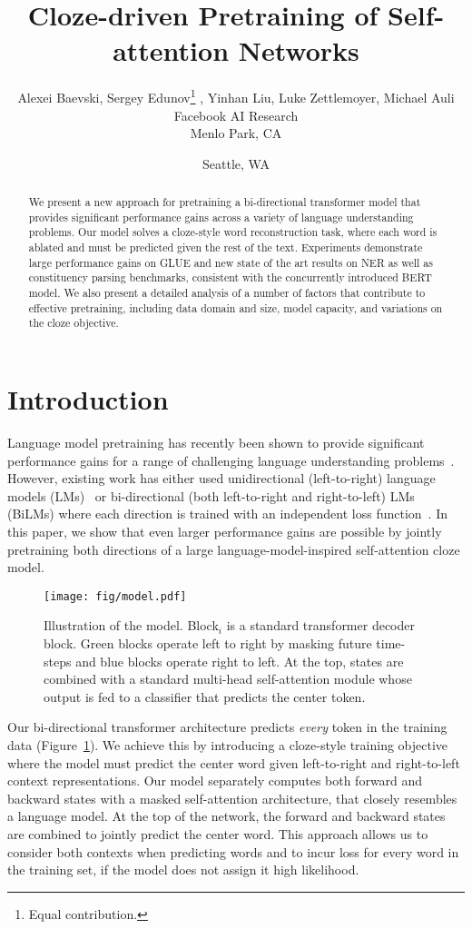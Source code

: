 \documentclass[11pt,a4paper]{article}
\title{Cloze-driven Pretraining of Self-attention Networks}
\author{Alexei Baevski, Sergey Edunov\thanks{\hspace{0.06in}Equal contribution.} , Yinhan Liu\samethanks{}\hspace{0.05in}, Luke Zettlemoyer, Michael Auli \\
  Facebook AI Research \\
  Menlo Park, CA \and Seattle, WA \\
}
\date{}
\begin{document}
\maketitle
\begin{abstract}
We present a new approach for pretraining a bi-directional transformer model that provides significant performance gains across a variety of language understanding problems. 
Our model solves a cloze-style word reconstruction task, where each word is ablated and must be predicted given the rest of the text. 
Experiments demonstrate large performance gains on GLUE and new state of the art results on NER as well as constituency parsing benchmarks, consistent with the concurrently introduced BERT model.
We also present a detailed analysis of a number of factors that contribute to effective pretraining, including data domain and size, model capacity, and variations on the cloze objective.
\end{abstract}


\section{Introduction}

Language model pretraining has recently been shown to provide significant performance gains for a range of challenging language understanding problems~\citep{dai2015arxiv,peters2018acl,radford2018unsup}. 
However, existing work has either used unidirectional (left-to-right) language models (LMs)~\citep{radford2018unsup} or bi-directional (both left-to-right and right-to-left) LMs (BiLMs) where each direction is trained with an independent loss function~\cite{peters2018acl}. 
In this paper, we show that even larger performance gains are possible by jointly pretraining both directions of a large language-model-inspired self-attention cloze model. 
\begin{figure}[t]
\centering
\texttt{[image: fig/model.pdf]}
\caption{Illustration of the model. Block$_i$ is a standard transformer decoder block. Green blocks operate left to right by masking future time-steps and blue blocks operate right to left. At the top, states are combined with a standard multi-head self-attention module whose output is fed to a classifier that predicts the center token.
}
\label{fig:model}
\end{figure}

Our bi-directional transformer architecture predicts \emph{every} token in the training data (Figure~\ref{fig:model}).
We achieve this by introducing a cloze-style training objective where the model must predict the center word given left-to-right and right-to-left context representations. 
Our model separately computes both forward and backward states with a masked self-attention architecture, that closely resembles a language model.
At the top of the network, the forward and backward states are combined to jointly predict the center word.
This approach allows us to consider both contexts when predicting words and to incur loss for every word in the training set, if the model does not assign it high likelihood. 
\end{document}
